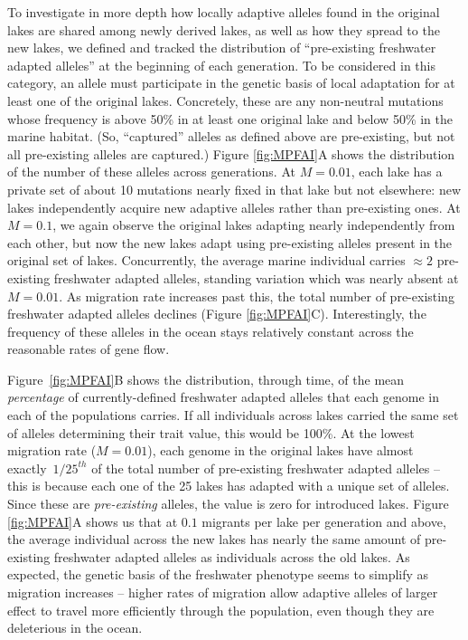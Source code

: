 \documentclass{article}
\begin{document}
To investigate in more depth how locally adaptive alleles found in the original lakes are shared among newly derived lakes, as well as how they spread to the new lakes, we defined and tracked the distribution of ``pre-existing freshwater adapted alleles'' at the beginning of each generation. 
To be considered in this category, an allele must participate in the genetic basis of local adaptation for at least one of the original lakes. 
Concretely, these are any non-neutral mutations whose frequency is above 50\% in at least one original lake and below 50\% in the marine habitat. 
(So, ``captured'' alleles as defined above are pre-existing, but not all pre-existing alleles are captured.)
Figure \ref{fig:MPFAI}A shows the distribution of the number of these alleles across generations. At $M = 0.01$, each lake has a private set of about 10 mutations nearly fixed in that lake but not elsewhere: new lakes independently acquire new adaptive alleles rather than pre-existing ones. 
At $M = 0.1$, we again observe the original lakes adapting nearly independently from each other, but now the new lakes adapt using pre-existing alleles present in the original set of lakes. 
Concurrently, the average marine individual carries $\approx 2$ pre-existing freshwater adapted alleles, standing variation which was nearly absent at $M=0.01$. As migration rate increases past this, the total number of pre-existing freshwater adapted alleles declines (Figure \ref{fig:MPFAI}C). Interestingly, the frequency of these alleles in the ocean
stays relatively constant across the reasonable rates of gene flow.

Figure~\ref{fig:MPFAI}B shows the distribution, through time, of the mean \emph{percentage} of currently-defined freshwater adapted alleles that each genome in each of the populations carries. 
If all individuals across lakes carried the same set of alleles determining their trait value, this would be 100\%. At the lowest migration rate ($M = 0.01$), each genome in the original lakes have almost exactly~$1/25^{th}$ of the total number of pre-existing freshwater adapted alleles -- this is because each one of the 25 lakes has adapted with a unique set of alleles. 
Since these are \emph{pre-existing} alleles, the value is zero for introduced lakes. 
Figure \ref{fig:MPFAI}A shows us that at $0.1$ migrants per lake per generation and above, the average individual across the new lakes has nearly the same amount of pre-existing freshwater adapted alleles as individuals across the old lakes. 
As expected, the genetic basis of the freshwater phenotype seems to simplify as migration increases -- higher rates of migration allow adaptive alleles of larger effect to travel more efficiently through the population, even though they are deleterious in the ocean.
\end{document}
